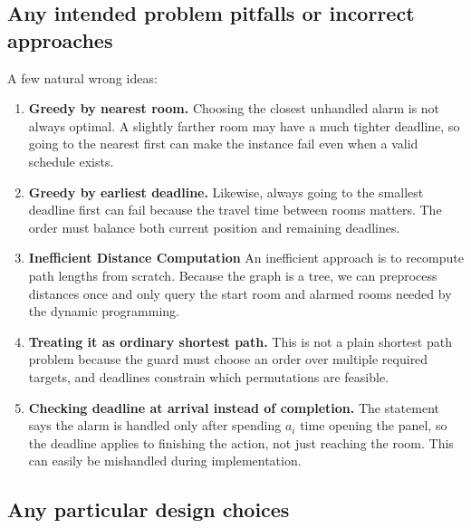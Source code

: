 \documentclass[11pt]{article}
\begin{document}
\subsection*{Any intended problem pitfalls or incorrect approaches}
A few natural wrong ideas:

\begin{enumerate}
    \item \textbf{Greedy by nearest room.} Choosing the closest unhandled alarm is not always optimal. A slightly farther room may have a much tighter deadline, so going to the nearest first can make the instance fail even when a valid schedule exists.
    
    \item \textbf{Greedy by earliest deadline.} Likewise, always going to the smallest deadline first can fail because the travel time between rooms matters. The order must balance both current position and remaining deadlines.
    
    \item \textbf{Inefficient Distance Computation} An inefficient approach is to recompute path lengths from scratch. Because the graph is a tree, we can preprocess distances once and only query the start room and alarmed rooms needed by the dynamic programming.

    \item \textbf{Treating it as ordinary shortest path.} This is not a plain shortest path problem because the guard must choose an order over multiple required targets, and deadlines constrain which permutations are feasible.
        
    \item \textbf{Checking deadline at arrival instead of completion.} The statement says the alarm is handled only after spending $a_i$ time opening the panel, so the deadline applies to finishing the action, not just reaching the room. This can easily be mishandled during implementation.
\end{enumerate}

\subsection*{Any particular design choices}
\end{document}
